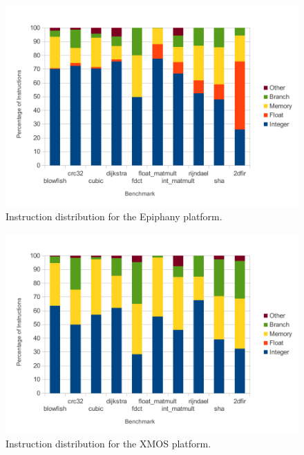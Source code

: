 \documentclass[twocolumn]{article}
\begin{document}
\begin{figure}[t]
	\includegraphics[width=\linewidth]{epiphany.pdf}
	\caption{Instruction distribution for the Epiphany platform.}
	\label{Fig:InstructionDistributionEpiphany}
\end{figure}

\begin{figure}[t]
	\includegraphics[width=\linewidth]{xmos.pdf}
	\caption{Instruction distribution for the XMOS platform.}
	\label{Fig:InstructionDistributionXMOS}
\end{figure}
\end{document}
